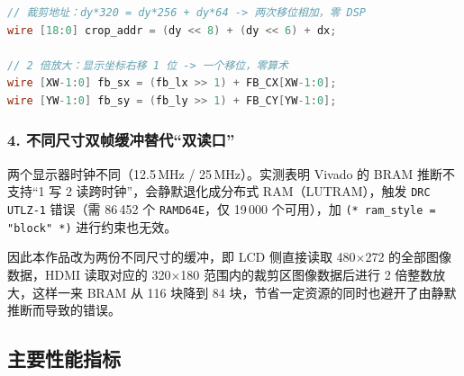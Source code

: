\documentclass[withoutpreface,bwprint]{cumcmthesis}
\begin{document}
\begin{lstlisting}[language=Verilog, basicstyle=\ttfamily\zihao{6},
                   frame=single, rulecolor=\color{boxFrame}]
// 裁剪地址：dy*320 = dy*256 + dy*64 -> 两次移位相加，零 DSP
wire [18:0] crop_addr = (dy << 8) + (dy << 6) + dx;

// 2 倍放大：显示坐标右移 1 位 -> 一个移位，零算术
wire [XW-1:0] fb_sx = (fb_lx >> 1) + FB_CX[XW-1:0];
wire [YW-1:0] fb_sy = (fb_ly >> 1) + FB_CY[YW-1:0];
\end{lstlisting}

\subsubsection*{4. 不同尺寸双帧缓冲替代“双读口”}

两个显示器时钟不同（12.5\,MHz / 25\,MHz）。实测表明 Vivado 的 BRAM 推断不支持“1 写 2 读跨时钟”，会静默退化成分布式 RAM（LUTRAM），触发 \texttt{DRC UTLZ-1} 错误（需 86\,452 个 \texttt{RAMD64E}，仅 19\,000 个可用），加 \texttt{(* ram\_style = "block" *)} 进行约束也无效。

因此本作品改为两份不同尺寸的缓冲，即 LCD 侧直接读取 480$\times$272 的全部图像数据，HDMI 读取对应的 320$\times$180 范围内的裁剪区图像数据后进行 2 倍整数放大，这样一来 BRAM 从 116 块降到 84 块，节省一定资源的同时也避开了由静默推断而导致的错误。

\subsection{主要性能指标}
\end{document}

